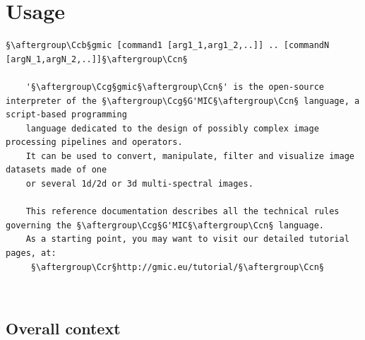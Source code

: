\documentclass[a4paper,10.5pt,twoside]{book}
\def\Ccr{\color{ca}}
\def\Ccb{\color{cb}}
\def\Ccg{\color{cc}}
\def\Ccn{\color{black}}
\begin{document}
\chapter{Usage} 
\small
\begin{lstlisting}[escapechar=§]
    §\aftergroup\Ccb§gmic [command1 [arg1_1,arg1_2,..]] .. [commandN [argN_1,argN_2,..]]§\aftergroup\Ccn§ 
 
    '§\aftergroup\Ccg§gmic§\aftergroup\Ccn§' is the open-source interpreter of the §\aftergroup\Ccg§G'MIC§\aftergroup\Ccn§ language, a script-based programming 
    language dedicated to the design of possibly complex image processing pipelines and operators. 
    It can be used to convert, manipulate, filter and visualize image datasets made of one 
    or several 1d/2d or 3d multi-spectral images. 
 
    This reference documentation describes all the technical rules governing the §\aftergroup\Ccg§G'MIC§\aftergroup\Ccn§ language. 
    As a starting point, you may want to visit our detailed tutorial pages, at: 
     §\aftergroup\Ccr§http://gmic.eu/tutorial/§\aftergroup\Ccn§
\end{lstlisting}
\normalsize
~\\\section{Overall context}
\small
\end{document}
